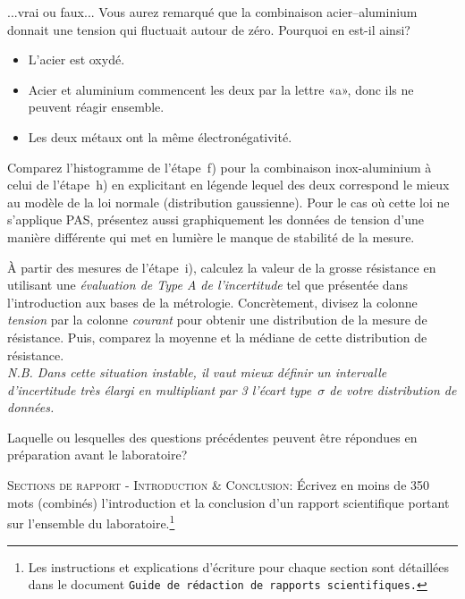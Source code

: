 \documentclass[canadien,12pt,oneside,letterpaper]{article}
\begin{document}
\begin{gradescope}
\begin{gradescope}
    \end{gradescope}
\item ...vrai ou faux... Vous aurez remarqué que la combinaison acier--aluminium donnait une tension qui fluctuait autour de zéro. Pourquoi en est-il ainsi?
    \begin{itemize}[label=$\blacktriangleright$]
    \item L'acier est oxydé.
    \item Acier et aluminium commencent les deux par la lettre «a», donc ils ne peuvent réagir ensemble.
    \item Les deux métaux ont la même électronégativité.
    \end{itemize}
\item Comparez l’histogramme de l’étape~f) pour la combinaison inox-aluminium à celui de l’étape~h) en explicitant en légende lequel des deux correspond le mieux au modèle de la loi normale (distribution gaussienne). Pour le cas où cette loi ne s’applique PAS, présentez aussi graphiquement les données de tension d'une manière différente qui met en lumière le manque de stabilité de la mesure.
\item À partir des mesures de l'étape~i), calculez la valeur de la grosse résistance en utilisant une \textit{évaluation de Type A de l'incertitude} tel que présentée dans l’introduction aux bases de la métrologie. Concrètement, divisez la colonne \textit{tension} par la colonne \textit{courant} pour obtenir une distribution de la mesure de résistance. Puis, comparez la moyenne et la médiane de cette distribution de résistance.\\ \textit{N.B. Dans cette situation instable, il vaut mieux définir un intervalle d'incertitude très élargi en multipliant par 3 l'écart type~$\sigma$ de votre distribution de données.}
\item Laquelle ou lesquelles des questions précédentes peuvent être répondues en préparation avant le laboratoire?
\item \textsc{Sections de rapport - Introduction \& Conclusion:} Écrivez en moins de 350 mots (combinés) l'introduction et la conclusion d'un rapport scientifique portant sur l'ensemble du laboratoire.\footnote{Les instructions et explications d'écriture pour chaque section sont détaillées dans le document \texttt{Guide de rédaction de rapports scientifiques.}}
\end{gradescope}
\end{document}
